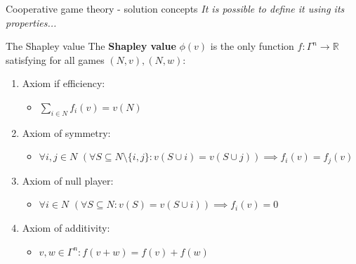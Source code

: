 \documentclass{beamer}
\begin{document}
\begin{frame}{Cooperative game theory - solution concepts}
    \textit{It is possible to define it using its properties...}
    \begin{block}{The Shapley value}
       The \textbf{Shapley value} $\phi(v)$ is the only function $f \colon \Gamma^n \to \mathbb{R}$ satisfying for all games $(N,v),(N,w)$:
        \begin{enumerate}
            \item Axiom if efficiency:
            \begin{itemize}
                \item $\sum_{i \in N}f_i(v) = v(N)$
            \end{itemize}
            \item Axiom of symmetry:
            \begin{itemize}
                \item$\forall i,j \in N$ $(\forall S \subseteq N \setminus \{i,j\}: v(S \cup i) = v(S \cup j)) \implies f_i(v) = f_j(v)$
            \end{itemize}
            \item Axiom of null player:
            \begin{itemize}
                \item $\forall i \in N$ $(\forall S \subseteq N: v(S) = v(S \cup i)) \implies f_i(v)=0$
            \end{itemize}
            \item Axiom of additivity:
            \begin{itemize}
                \item $v,w \in \Gamma^n: f(v+w)=f(v)+f(w)$
            \end{itemize}
        \end{enumerate}

    \end{block}
\end{frame}


\end{document}
